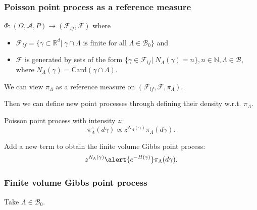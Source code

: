 \documentclass[c, 10pt]{beamer}
\begin{document}
\begin{frame}\frametitle{Poisson point process as a reference measure}
$\Phi: (\Omega, \mathcal A, P) \to (\mathcal F_{lf}, \mathscr F)$ where 
\begin{itemize}
\item $\mathcal F_{lf} = \{ \gamma \subset \mathbb R^d | \; \gamma \cap \Lambda \text{ is finite for all } \Lambda \in \mathcal B_0\}$ and 
\item $\mathscr F$ is generated by sets of the form $\{\gamma \in \mathcal F_{lf} | \; N_\Lambda(\gamma) = n \}, n \in \mathbb N, \Lambda \in \mathcal B$, where $N_\Lambda(\gamma) = \text{Card}(\gamma \cap \Lambda)$.
\end{itemize}
\vspace{3mm}

We can view $\pi_\Lambda$ as a reference measure on $(\mathcal F_{lf}, \mathscr F, \pi_\Lambda)$.

Then we can define new point processes through defining their density w.r.t. $\pi_\Lambda$.

\vspace{2mm}
Poisson point process with intensity $z$:
$$ \pi^z_\Lambda (d\gamma) \propto z^{N_\Lambda(\gamma)} \pi_\Lambda(d\gamma).$$

Add a new term to obtain the finite volume Gibbs point process:
$$ z^{N_\Lambda(\gamma)} \alert{ e^{- H(\gamma)} } \pi_\Lambda(d\gamma)  .$$

\end{frame}



\begin{frame}\frametitle{Finite volume Gibbs point process}
Take $\Lambda \in \mathcal B_0$.

\vspace{3mm}


\end{frame}
\end{document}
